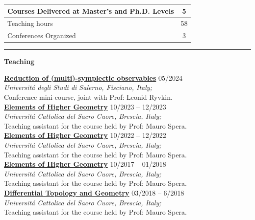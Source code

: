 \documentclass[a4paper]{article}
\newcommand{\block}[1]{\hrule \vspace{0.2cm} \textbf{\Large #1} \vspace{0.2cm}}
\newcommand{\voice}[5]{\href{#4}{\textbf{#1}} \hfill #2 \\ \textit{#3} \\ {\small #5} \vspace{0.2cm} \\}
\begin{document}
		\begin{center}
	\begin{tabularx}{.5\linewidth}{|X|c|}
	\hline
	
	Courses Delivered at Master's and Ph.D. Levels & 5 \\
	\hline
	
	Teaching hours & 58 \\
	\hline

	Conferences Organized & 3 \\
	\hline	
	
	\end{tabularx}		
		\end{center}
	\vspace{1em}




	\block{Teaching}

	\voice{Reduction of (multi)-symplectic observables}
		{05/2024}
		{Universit\'a degli Studi di Salerno, Fisciano, Italy;}
		{https://www.antoniomiti.it/teaching/Obs-Constraint-2024/}       
		{Conference mini-course, joint with Prof: Leonid Ryvkin.}
	\voice{Elements of Higher Geometry}
		{10/2023 -- 12/2023}
		{Universit\'a Cattolica del Sacro Cuore, Brescia, Italy;}
		{https://dmf.unicatt.it/miti/teaching/IstGeoSup-22-23/}       
		{Teaching assistant for the course held by Prof: Mauro Spera.}
	\voice{Elements of Higher Geometry}
		{10/2022 -- 12/2022}
		{Universit\'a Cattolica del Sacro Cuore, Brescia, Italy;}
		{https://dmf.unicatt.it/miti/teaching/IstGeoSup-22-23/}       
		{Teaching assistant for the course held by Prof: Mauro Spera.}
	\voice{Elements of Higher Geometry}
		{10/2017 -- 01/2018}
		{Universit\'a Cattolica del Sacro Cuore, Brescia, Italy;}
		{http://docenti.unicatt.it/web/html/index.html\#/programmi/BS/2D9B/75017/2017/21065/MIH341/ita}       
		{Teaching assistant for the course held by Prof: Mauro Spera.}
	\voice{Differential Topology and Geometry}
		{03/2018 -- 6/2018}
		{Universit\'a Cattolica del Sacro Cuore, Brescia, Italy;}
		{http://docenti.unicatt.it/web/html/index.html\#/programmi/BS/2D8B/75017/2017/21065/MGH344/ita}       
		{Teaching assistant for the course held by Prof: Mauro Spera.}


\end{document}
